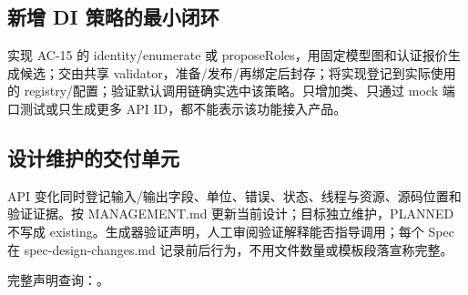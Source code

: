 \subsection{新增 DI 策略的最小闭环}
实现 AC-15 的 identity/enumerate 或 proposeRoles，用固定模型图和认证报价生成候选；交由共享 validator，准备/发布/再绑定后封存；将实现登记到实际使用的 registry/配置；验证默认调用链确实选中该策略。只增加类、只通过 mock 端口测试或只生成更多 API ID，都不能表示该功能接入产品。

\subsection{设计维护的交付单元}
API 变化同时登记输入/输出字段、单位、错误、状态、线程与资源、源码位置和验证证据。按 MANAGEMENT.md 更新当前设计；目标独立维护，PLANNED 不写成 existing。生成器验证声明，人工审阅验证解释能否指导调用；每个 Spec 在 spec-design-changes.md 记录前后行为，不用文件数量或模板段落宣称完整。

完整声明查询：。

